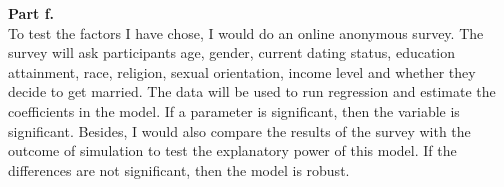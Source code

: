 \documentclass[letterpaper,12pt]{article}
\theoremstyle{definition}
\begin{document}
\textbf{Part f.} \\
To test the factors I have chose, I would do an online anonymous survey. The survey will ask participants age, gender, current dating status, education attainment, race, religion, sexual orientation, income level and whether they decide to get married. The data will be used to run regression and estimate the coefficients in the model. If a parameter is significant, then the variable is significant. Besides, I would also compare the results of the survey with the outcome of simulation to test the explanatory power of this model. If the differences are not significant, then the model is robust.
\end{document}
